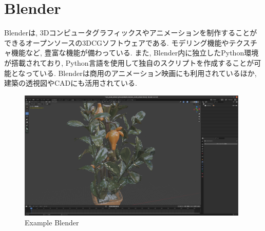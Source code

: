 \section{Blender}
Blenderは, 3Dコンピュータグラフィックスやアニメーションを制作することができるオープンソースの3DCGソフトウェアである.
モデリング機能やテクスチャ機能など, 豊富な機能が備わっている.
また, Blender内に独立したPython環境が搭載されており, Python言語を使用して独自のスクリプトを作成することが可能となっている.
Blenderは商用のアニメーション映画にも利用されているほか, 建築の透視図やCADにも活用されている.

\vspace{5mm}
\begin{figure}[H]
     \centering
     \includegraphics[width=110mm]{images/png/blenderex.png}
     \caption{Example Blender}
     \label{Fig:blenderex}
   \end{figure}